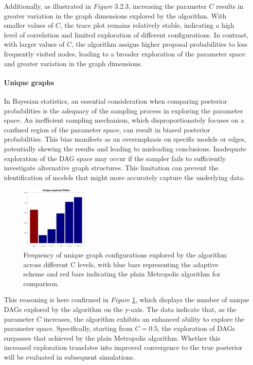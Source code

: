 \documentclass{report}
\begin{document}
Additionally, as illustrated in \textit{Figure} 3.2.3, increasing the parameter $C$ results in greater variation in the graph dimensions explored by the algorithm. With smaller values of $C$, the trace plot remains relatively stable, indicating a high level of correlation and limited exploration of different configurations. In contrast, with larger values of $C$, the algorithm assigns higher proposal probabilities to less frequently visited nodes, leading to a broader exploration of the parameter space and greater variation in the graph dimensions.

\paragraph{Unique graphs}

In Bayesian statistics, an essential consideration when comparing posterior probabilities is the adequacy of the sampling process in exploring the parameter space. An inefficient sampling mechanism, which disproportionately focuses on a confined region of the parameter space, can result in biased posterior probabilities. This bias manifests as an overemphasis on specific models or edges, potentially skewing the results and leading to misleading conclusions. Inadequate exploration of the DAG space may occur if the sampler fails to sufficiently investigate alternative graph structures. This limitation can prevent the identification of models that might more accurately capture the underlying data. 

\begin{figure}[h] 
	\centering
	\includegraphics[width=0.3\textwidth]{Figures/Adaptive_behaviour/UniqueHist.png}
	\caption{Frequency of unique graph configurations explored by the algorithm across different C levels, with blue bars representing the adaptive scheme and red bars indicating the plain Metropolis algorithm for comparison.}
	\label{fig:unique-hist}
\end{figure}

This reasoning is here confirmed in \textit{Figure} \ref{fig:unique-hist}, which displays the number of unique DAGs explored by the algorithm on the y-axis. The data indicate that, as the parameter $C$ increases, the algorithm exhibits an enhanced ability to explore the parameter space. Specifically, starting from $C = 0.5$, the exploration of DAGs surpasses that achieved by the plain Metropolis algorithm. Whether this increased exploration translates into improved convergence to the true posterior will be evaluated in subsequent simulations.
\end{document}
